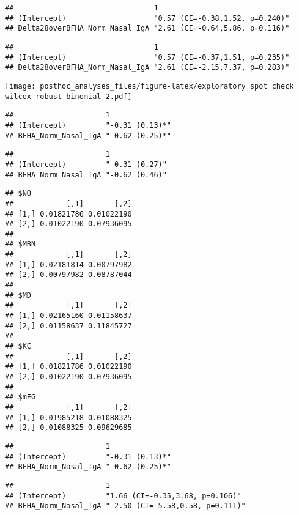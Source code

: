 \documentclass[
]{article}
\begin{document}
\begin{verbatim}
##                                1                              
## (Intercept)                    "0.57 (CI=-0.38,1.52, p=0.240)"
## Delta28overBFHA_Norm_Nasal_IgA "2.61 (CI=-0.64,5.86, p=0.116)"
\end{verbatim}

\begin{verbatim}
##                                1                              
## (Intercept)                    "0.57 (CI=-0.37,1.51, p=0.235)"
## Delta28overBFHA_Norm_Nasal_IgA "2.61 (CI=-2.15,7.37, p=0.283)"
\end{verbatim}

\texttt{[image: posthoc\_analyses\_files/figure-latex/exploratory spot check wilcox robust binomial-2.pdf]}

\begin{verbatim}
##                     1              
## (Intercept)         "-0.31 (0.13)*"
## BFHA_Norm_Nasal_IgA "-0.62 (0.25)*"
\end{verbatim}

\begin{verbatim}
##                     1             
## (Intercept)         "-0.31 (0.27)"
## BFHA_Norm_Nasal_IgA "-0.62 (0.46)"
\end{verbatim}

\begin{verbatim}
## $NO
##            [,1]       [,2]
## [1,] 0.01821786 0.01022190
## [2,] 0.01022190 0.07936095
## 
## $MBN
##            [,1]       [,2]
## [1,] 0.02181814 0.00797982
## [2,] 0.00797982 0.08787044
## 
## $MD
##            [,1]       [,2]
## [1,] 0.02165160 0.01158637
## [2,] 0.01158637 0.11845727
## 
## $KC
##            [,1]       [,2]
## [1,] 0.01821786 0.01022190
## [2,] 0.01022190 0.07936095
## 
## $mFG
##            [,1]       [,2]
## [1,] 0.01985218 0.01088325
## [2,] 0.01088325 0.09629685
\end{verbatim}

\begin{verbatim}
##                     1              
## (Intercept)         "-0.31 (0.13)*"
## BFHA_Norm_Nasal_IgA "-0.62 (0.25)*"
\end{verbatim}

\begin{verbatim}
##                     1                               
## (Intercept)         "1.66 (CI=-0.35,3.68, p=0.106)" 
## BFHA_Norm_Nasal_IgA "-2.50 (CI=-5.58,0.58, p=0.111)"
\end{verbatim}
\end{document}
